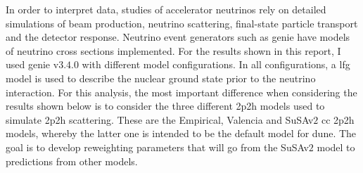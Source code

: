 %
In order to interpret data, studies of accelerator neutrinos rely on detailed simulations of beam production, neutrino scattering, final-state particle transport and the detector response. Neutrino event generators such as \acrshort{genie} have models of neutrino cross sections implemented. %
For the results shown in this report, I used \acrshort{genie} v$3.4.0$ with different model configurations. In all configurations, a \acrfull{lfg} model is used to describe the nuclear ground state prior to the neutrino interaction. %
For this analysis, the most important difference when considering the results shown below is to consider the three different \acrshort{2p2h} models used to simulate \acrshort{2p2h} scattering. These are the Empirical, Valencia and SuSAv$2$ \acrshort{cc} \acrshort{2p2h} models, whereby the latter one is intended to be the default model for \acrshort{dune}. The goal is to develop reweighting parameters that will go from the SuSAv$2$ model to predictions from other models.

